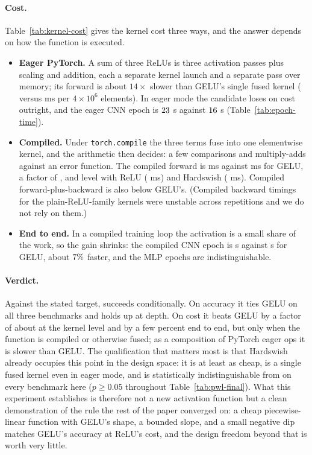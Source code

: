 \documentclass[11pt]{article}
\begin{document}
{\paragraph{Cost.} Table~\ref{tab:kernel-cost} gives the kernel cost three ways, and the answer depends
on how the function is executed.
\begin{itemize}[nosep]
  \item \textbf{Eager PyTorch.} A sum of three ReLUs is three activation passes plus scaling and
        addition, each a separate kernel launch and a separate pass over memory; its forward is about
        $14\times$ slower than GELU's single fused kernel (\costBestEagerFwd{} versus
        \costGeluEagerFwd{} ms per $4\times10^6$ elements). In eager mode the candidate loses on cost
        outright, and the eager CNN epoch is $23$ s against $16$ s
        (Table~\ref{tab:epoch-time}).
  \item \textbf{Compiled.} Under \texttt{torch.compile} the three terms fuse into one elementwise
        kernel, and the arithmetic then decides: a few comparisons and multiply-adds against an error
        function. The compiled forward is \costBestCompiledFwd{} ms against \costGeluCompiledFwd{} ms for
        GELU, a factor of \costBestFwdRatio, and level with ReLU (\costReluCompiledFwd{} ms) and
        Hardswish (\costHswCompiledFwd{} ms). Compiled forward-plus-backward is also below GELU's.
        (Compiled backward timings for the plain-ReLU-family kernels were unstable across repetitions
        and we do not rely on them.)
  \item \textbf{End to end.} In a compiled training loop the activation is a small share of the work,
        so the gain shrinks: the compiled CNN epoch is \epochBestCnnCompiled{} s against
        \epochGeluCnnCompiled{} s for GELU, about $7\%$ faster, and the MLP epochs are
        indistinguishable.
\end{itemize}

\paragraph{Verdict.} Against the stated target, \pwlBest{} succeeds conditionally. On accuracy it ties
GELU on all three benchmarks and holds up at depth. On cost it beats GELU by a factor of about
\costBestFwdRatio{} at the kernel level and by a few percent end to end, but only when the function is
compiled or otherwise fused; as a composition of PyTorch eager ops it is slower than GELU. The
qualification that matters most is that Hardswish already occupies this point in the design space: it
is at least as cheap, is a single fused kernel even in eager mode, and is statistically
indistinguishable from \pwlBest{} on every benchmark here ($p\ge0.05$ throughout
Table~\ref{tab:pwl-final}). What this experiment establishes is therefore not a new activation
function but a clean demonstration of the rule the rest of the paper converged on: a cheap
piecewise-linear function with GELU's shape, a bounded slope, and a small negative dip matches GELU's
accuracy at ReLU's cost, and the design freedom beyond that is worth very little.
}{}
\end{document}
